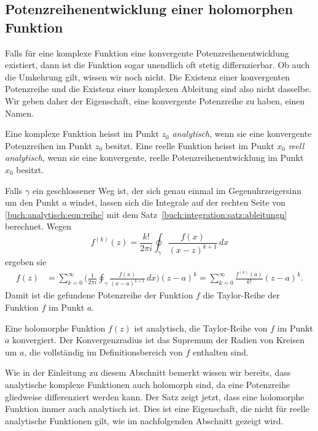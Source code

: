 %
%
%
\subsection{Potenzreihenentwicklung einer holomorphen Funktion}
Falls für eine komplexe Funktion eine konvergente Potenzreihenentwicklung
existiert, dann ist die Funktion sogar unendlich oft stetig differnzierbar.
Ob auch die Umkehrung gilt, wissen wir noch nicht.
Die Existenz einer konvergenten Potenzreihe und die Existenz einer
komplexen Ableitung sind also nicht dasselbe.
Wir geben daher der Eigenschaft, eine konvergente Potenzreihe zu haben,
einen Namen.

\begin{definition}[analytisch]
Eine komplexe Funktion heisst im Punkt $z_0$ \emph{analytisch}, wenn sie eine
konvergente Potenzreihen im Punkt $z_0$ besitzt.
%
Eine reelle Funktion heisst im Punkt $x_0$ \emph{reell analytisch}, wenn sie
eine konvergente, reelle Potenzreihenentwicklung im Punkt $x_0$ besitzt.
%
\end{definition}

Falls $\gamma$ ein geschlossener Weg ist, der sich genau einmal
im Gegenuhrzeigersinn um den Punkt $a$ windet, lassen sich die
Integrale auf der rechten Seite von \eqref{buch:analytisch:eqn:reihe}
mit dem Satz~\ref{buch:integration:satz:ableitungn}
berechnet.
Wegen
\[
f^{(k)}(z)
=
\frac{k!}{2\pi i}
\oint_\gamma
\frac{f(x)}{(x-z)^{k+1}}
\,dx
\]
ergeben sie
\begin{align*}
f(z)
&=
\sum_{k=0}^{\infty}
\biggl(
\frac{1}{2\pi i}
\oint_\gamma
\frac{f(x)}
{(x-a)^{k+1}}
\,dx
\biggr)
(z-a)^k
=
\sum_{k=0}^\infty
\frac{f^{(k)}(a)}{k!}
(z-a)^k.
\end{align*}
Damit ist die gefundene Potenzreihe der Funktion $f$ die
Taylor-Reihe der Funktion $f$ im Punkt $a$.

\begin{satz}
\label{buch:analytisch:satz:holomorph-analytisch}
Eine holomorphe Funktion $f(z)$ ist analytisch, die Taylor-Reihe
von $f$ im Punkt $a$ konvergiert.
Der Konvergenzradius ist das Supremum der Radien von Kreisen um $a$,
die vollständig im Definitionsbereich von $f$ enthalten sind.
\end{satz}

Wie in der Einleitung zu diesem Abschnitt bemerkt wissen wir bereits,
dass analytische komplexe Funktionen auch holomorph sind, da eine
Potenzreihe gliedweise differenziert werden kann.
Der Satz zeigt jetzt, dass eine holomorphe Funktion immer auch
analytisch ist.
Dies ist eine Eigenschaft, die nicht für reelle analytische
Funktionen gilt, wie im nachfolgenden Abschnitt gezeigt wird.
